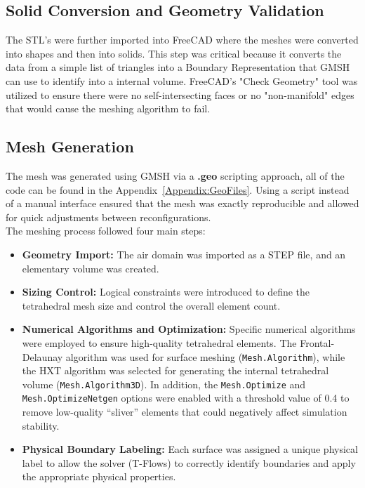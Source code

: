 \documentclass[a4paper, 10pt]{article}
\begin{document}
		\subsection{Solid Conversion and Geometry Validation}
			\noindent The STL's were further imported into FreeCAD where the meshes were converted into shapes and then into solids. This step was critical because it converts the data from a simple list of triangles into a Boundary Representation that GMSH can use to identify into a internal volume. FreeCAD's "Check Geometry" tool was utilized to ensure there were no self-intersecting faces or no "non-manifold" edges that would cause the meshing algorithm to fail.

		\subsection{Mesh Generation}
			\noindent The mesh was generated using GMSH via a \textbf{.geo} scripting approach, all of the code can be found in the Appendix~\ref{Appendix:GeoFiles}. Using a script instead of a manual interface ensured that the mesh was exactly reproducible and allowed for quick adjustments between reconfigurations. \\

			\noindent The meshing process followed four main steps:

			\begin{itemize}
				\item \textbf{Geometry Import:} The air domain was imported as a STEP file, and an elementary volume was created.

				\item \textbf{Sizing Control:} Logical constraints were introduced to define the tetrahedral mesh size and control the overall element count.

				\item \textbf{Numerical Algorithms and Optimization:} Specific numerical algorithms were employed to ensure high-quality tetrahedral elements. The Frontal-Delaunay algorithm was used for surface meshing (\texttt{Mesh.Algorithm}), while the HXT algorithm was selected for generating the internal tetrahedral volume (\texttt{Mesh.Algorithm3D}). In addition, the \texttt{Mesh.Optimize} and \texttt{Mesh.OptimizeNetgen} options were enabled with a threshold value of 0.4 to remove low-quality ``sliver'' elements that could negatively affect simulation stability.

				\item \textbf{Physical Boundary Labeling:} Each surface was assigned a unique physical label to allow the solver (T-Flows) to correctly identify boundaries and apply the appropriate physical properties.
			\end{itemize}
	
\end{document}

